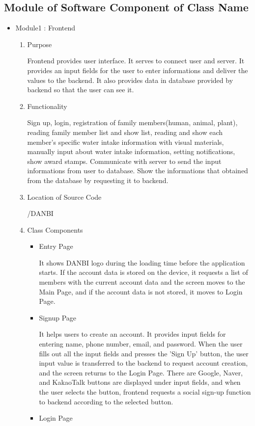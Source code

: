 \documentclass[conference]{IEEEtran}
\begin{document}
\subsection{Module of Software Component of Class Name}
\setlength{\parindent}{2ex}

\begin{itemize}
    \item Module1 : Frontend
    \begin{enumerate}
    \setlength{\parindent}{2ex}
    \setlength{\parskip}{0.5em}
        \item Purpose
        
        Frontend provides user interface. It serves to connect user and server. It provides an input fields for the user to enter informations and deliver the values to the backend. It also provides data in database provided by backend so that the user can see it.
        \item Functionality
        
        Sign up, login, registration of family members(human, animal, plant), reading family member list and show list, reading and show each member's specific water intake information with visual materials, manually input about water intake information, setting notifications, show award stamps. Communicate with server to send the input informations from user to database. Show the informations that obtained from the database by requesting it to backend.
        \item Location of Source Code
        
        /DANBI
        \item Class Components
        \begin{itemize}
            \item Entry Page
            \setlength{\parindent}{2ex}
            
            It shows DANBI logo during the loading time before the application starts. If the account data is stored on the device, it requests a list of members with the current account data and the screen moves to the Main Page, and if the account data is not stored, it moves to Login Page.
            \item Signup Page
            \setlength{\parindent}{2ex}
            
            It helps users to create an account. It provides input fields for entering name, phone number, email, and password. When the user fills out all the input fields and presses the 'Sign Up' button, the user input value is transferred to the backend to request account creation, and the screen returns to the Login Page. There are Google, Naver, and KakaoTalk buttons are displayed under input fields, and when the user selects the button, frontend requests a social sign-up function to backend according to the selected button.
            \item Login Page
            \setlength{\parindent}{2ex}
            

\end{itemize}
\end{enumerate}
\end{itemize}
\end{document}
